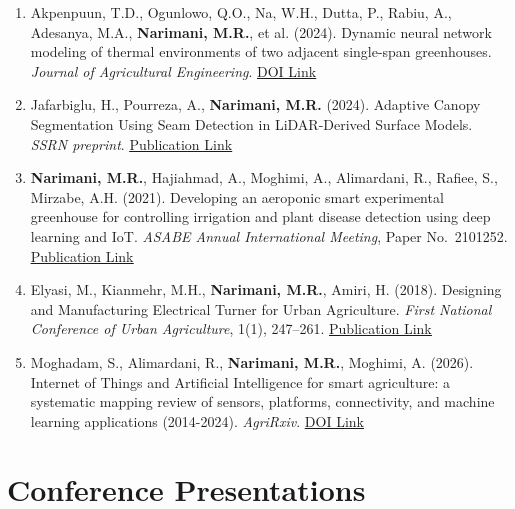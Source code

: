 \documentclass[11pt,a4paper]{article}
\begin{document}
\begin{enumerate}
\item Akpenpuun, T.D., Ogunlowo, Q.O., Na, W.H., Dutta, P., Rabiu, A., Adesanya, M.A., \textbf{Narimani, M.R.}, et al. (2024). Dynamic neural network modeling of thermal environments of two adjacent single-span greenhouses. \textit{Journal of Agricultural Engineering}. \href{https://doi.org/10.4081/jae.2024.1563}{\underline{DOI Link}}

\item Jafarbiglu, H., Pourreza, A., \textbf{Narimani, M.R.} (2024). Adaptive Canopy Segmentation Using Seam Detection in LiDAR-Derived Surface Models. \textit{SSRN preprint}. \href{https://papers.ssrn.com/sol3/papers.cfm?abstract_id=7194628}{\underline{Publication Link}}

\item \textbf{Narimani, M.R.}, Hajiahmad, A., Moghimi, A., Alimardani, R., Rafiee, S., Mirzabe, A.H. (2021). Developing an aeroponic smart experimental greenhouse for controlling irrigation and plant disease detection using deep learning and IoT. \textit{ASABE Annual International Meeting}, Paper No.\ 2101252. \href{https://elibrary.asabe.org/abstract.asp?aid=52586}{\underline{Publication Link}}

\item Elyasi, M., Kianmehr, M.H., \textbf{Narimani, M.R.}, Amiri, H. (2018). Designing and Manufacturing Electrical Turner for Urban Agriculture. \textit{First National Conference of Urban Agriculture}, 1(1), 247--261. \href{https://civilica.com/doc/838593/}{\underline{Publication Link}}

\item Moghadam, S., Alimardani, R., \textbf{Narimani, M.R.}, Moghimi, A. (2026). Internet of Things and Artificial Intelligence for smart agriculture: a systematic mapping review of sensors, platforms, connectivity, and machine learning applications (2014-2024). \textit{AgriRxiv}. \href{https://www.cabidigitallibrary.org/doi/abs/10.31220/agriRxiv.2026.00392}{\underline{DOI Link}}
\end{enumerate}

\section{Conference Presentations}
\end{document}
